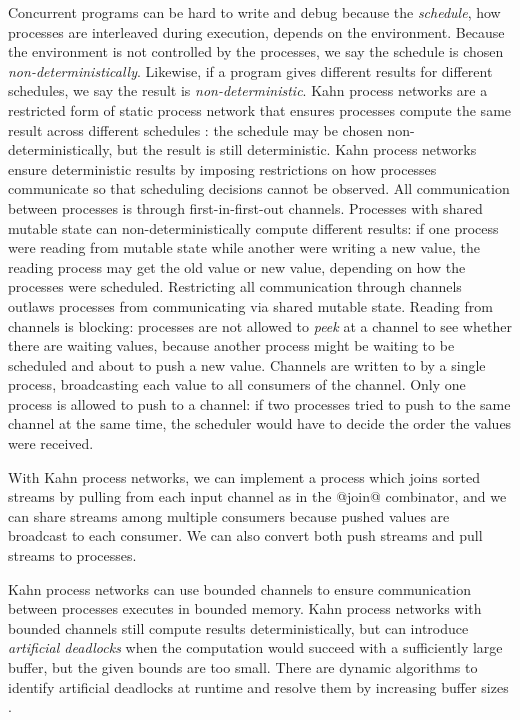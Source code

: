 Concurrent programs can be hard to write and debug because the \emph{schedule}, how processes are interleaved during execution, depends on the environment.
Because the environment is not controlled by the processes, we say the schedule is chosen \emph{non-deterministically}.
Likewise, if a program gives different results for different schedules, we say the result is \emph{non-deterministic}.
Kahn process networks are a restricted form of static process network that ensures processes compute the same result across different schedules \cite{kahn1976coroutines}: the schedule may be chosen non-deterministically, but the result is still deterministic.
Kahn process networks ensure deterministic results by imposing restrictions on how processes communicate so that scheduling decisions cannot be observed.
All communication between processes is through first-in-first-out channels.
Processes with shared mutable state can non-deterministically compute different results: if one process were reading from mutable state while another were writing a new value, the reading process may get the old value or new value, depending on how the processes were scheduled.
Restricting all communication through channels outlaws processes from communicating via shared mutable state.
Reading from channels is blocking: processes are not allowed to \emph{peek} at a channel to see whether there are waiting values, because another process might be waiting to be scheduled and about to push a new value.
Channels are written to by a single process, broadcasting each value to all consumers of the channel.
Only one process is allowed to push to a channel: if two processes tried to push to the same channel at the same time, the scheduler would have to decide the order the values were received.

With Kahn process networks, we can implement a process which joins sorted streams by pulling from each input channel as in the @join@ combinator, and we can share streams among multiple consumers because pushed values are broadcast to each consumer.
We can also convert both push streams and pull streams to processes.

Kahn process networks can use bounded channels to ensure communication between processes executes in bounded memory.
Kahn process networks with bounded channels still compute results deterministically, but can introduce \emph{artificial deadlocks} when the computation would succeed with a sufficiently large buffer, but the given bounds are too small.
There are dynamic algorithms to identify artificial deadlocks at runtime and resolve them by increasing buffer sizes \cite{parks1995bounded,geilen2003requirements}.


